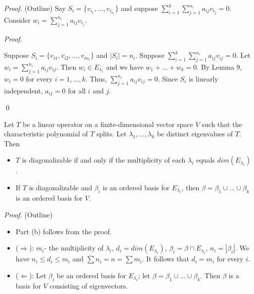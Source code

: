 \documentclass[12pt]{article}
\newenvironment{theorem}[2][Theorem]{\begin{trivlist}
\item[\hskip \labelsep {\bfseries #1}\hskip \labelsep {\bfseries #2.}]}{\end{trivlist}}
\newenvironment{sol}
    {\emph{Proof.}
    }
    {
    \qed
    }
\begin{document}
\textit{Proof.} (Outline)
Say $S_i = \{v_{i_1}, \dots, v_{i_{n_i}}\}$ and suppose $\sum_{i = 1}^k\sum_{j = 1}^{n_i}a_{ij}v_{i_j} = 0$. Consider $w_i = \sum_{j = 1}^{n_i}a_{ij}v_{i_j}$.

\begin{sol}
Suppose $S_i = \{v_{i1}, v_{i2}, \dots, v_{in_i}\}$ and $|S_i| = n_i$. Suppose $\sum_{i = 1}^k \sum_{j = 1}^{n_i} a_{ij}v_{ij} = 0$. Let $w_i = \sum_{j = 1}^{n_i}a_{ij}v_{ij}$. Then $w_i \in E_{\lambda_i}$ and we have $w_1 + \dots + w_k = 0$. By Lemma 9, $w_i = 0$ for every $i = 1, \dots, k$. Thus, $\sum_{j = 1}^{n_i} a_{ij}v_{ij} = 0$. Since $S_i$ is linearly independent, $a_{ij} = 0$ for all $i$ and $j$.
\end{sol}

\begin{theorem}{5.9}
Let $T$ be a linear operator on a finite-dimensional vector space $V$ such that the characteristic polynomial of $T$ splits. Let $\lambda_1, \dots, \lambda_k$ be distinct eigenvalues of $T$. Then

\begin{itemize}
    \item[(a)] $T$ is diagonalizable if and only if the multiplicity of each $\lambda_i$ equals $dim(E_{\lambda_i})$.
    
    \item[(b)] If $T$ is diagonalizable and $\beta_i$ is an ordered basis for $E_{\lambda_i}$, then $\beta = \beta_1 \cup \dots \cup \beta_k$ is an ordered basis for $V$.
\end{itemize}
\end{theorem}

\textit{Proof.} (Outline)
\begin{itemize}
    \item Part (b) follows from the proof.
    
    \item ($\Longrightarrow$): $m_i$- the multiplicity of $\lambda_i$, $d_i = dim(E_{\lambda_i})$, $\beta_i = \beta \cap E_{\lambda_i}$, $n_i = | \beta_i |$. We have $n_i \leq d_i \leq m_i$ and $\sum n_i = n = \sum m_i$. It follows that $d_i = m_i$ for every $i$.
    
    \item ($\Longleftarrow$): Let $\beta_i$ be an ordered basis for $E_{\lambda_i}$; let $\beta = \beta_1 \cup \dots \cup \beta_k$. Then $\beta$ is a basis for $V$ consisting of eigenvectors.
\end{itemize}
\end{document}
